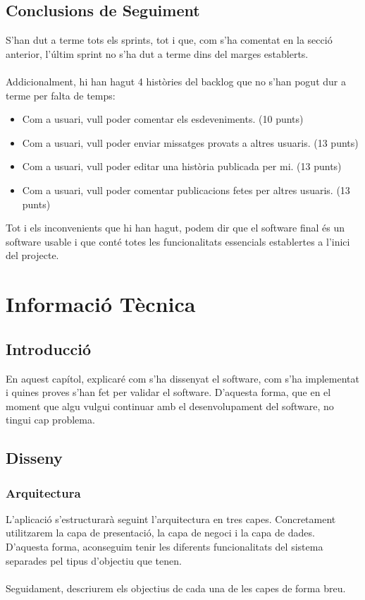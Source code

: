 \documentclass[11pt,catalan,listoffigures,listoftables]{tfgetsinf}
\begin{document}
\section{Conclusions de Seguiment}

S'han dut a terme tots els sprints, tot i que, com s'ha comentat en la secció anterior, l'últim sprint no s'ha dut a terme dins del marges establerts.\\ \\
Addicionalment, hi han hagut 4 històries del backlog que no s'han pogut dur a terme per falta de temps:
\begin{itemize}
	\item Com a usuari, vull poder comentar els esdeveniments. (10 punts)
	\item Com a usuari, vull poder enviar missatges provats a altres usuaris. (13 punts)
	\item Com a usuari, vull poder editar una història publicada per mi. (13 punts)
	\item Com a usuari, vull poder comentar publicacions fetes per altres usuaris. (13 punts)
\end{itemize}
Tot i els inconvenients que hi han hagut, podem dir que el software final és un software usable i que conté totes les funcionalitats essencials establertes a l'inici del projecte.

\chapter{Informació Tècnica}

\section{Introducció}

En aquest capítol, explicaré com s'ha dissenyat el software, com s'ha implementat i quines proves s'han fet per validar el software. D'aquesta forma, que en el moment que algu vulgui continuar amb el desenvolupament del software, no tingui cap problema.

\section{Disseny}
\subsection{Arquitectura}
L'aplicació s'estructurarà seguint l'arquitectura en tres capes. Concretament utilitzarem la capa de presentació, la capa de negoci i la capa de dades. D'aquesta forma, aconseguim tenir les diferents funcionalitats del sistema separades pel tipus d'objectiu que tenen.\\ \\
Seguidament, descriurem els objectius de cada una de les capes de forma breu.
\end{document}
